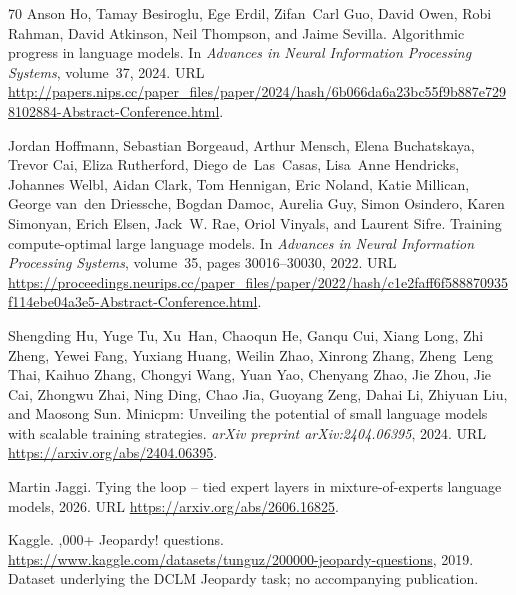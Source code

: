 \documentclass[]{bytedance_seed}
\theoremstyle{definition}
\theoremstyle{remark}
\begin{document}
\begin{thebibliography}{70}
Anson Ho, Tamay Besiroglu, Ege Erdil, Zifan~Carl Guo, David Owen, Robi Rahman,
  David Atkinson, Neil Thompson, and Jaime Sevilla.
\newblock Algorithmic progress in language models.
\newblock In \emph{Advances in Neural Information Processing Systems},
  volume~37, 2024.
\newblock URL
  \url{http://papers.nips.cc/paper_files/paper/2024/hash/6b066da6a23bc55f9b887e7298102884-Abstract-Conference.html}.

Jordan Hoffmann, Sebastian Borgeaud, Arthur Mensch, Elena Buchatskaya, Trevor
  Cai, Eliza Rutherford, Diego de~Las~Casas, Lisa~Anne Hendricks, Johannes
  Welbl, Aidan Clark, Tom Hennigan, Eric Noland, Katie Millican, George van~den
  Driessche, Bogdan Damoc, Aurelia Guy, Simon Osindero, Karen Simonyan, Erich
  Elsen, Jack~W. Rae, Oriol Vinyals, and Laurent Sifre.
\newblock Training compute-optimal large language models.
\newblock In \emph{Advances in Neural Information Processing Systems},
  volume~35, pages 30016--30030, 2022.
\newblock URL
  \url{https://proceedings.neurips.cc/paper_files/paper/2022/hash/c1e2faff6f588870935f114ebe04a3e5-Abstract-Conference.html}.

Shengding Hu, Yuge Tu, Xu~Han, Chaoqun He, Ganqu Cui, Xiang Long, Zhi Zheng,
  Yewei Fang, Yuxiang Huang, Weilin Zhao, Xinrong Zhang, Zheng~Leng Thai,
  Kaihuo Zhang, Chongyi Wang, Yuan Yao, Chenyang Zhao, Jie Zhou, Jie Cai,
  Zhongwu Zhai, Ning Ding, Chao Jia, Guoyang Zeng, Dahai Li, Zhiyuan Liu, and
  Maosong Sun.
\newblock Minicpm: Unveiling the potential of small language models with
  scalable training strategies.
\newblock \emph{arXiv preprint arXiv:2404.06395}, 2024.
\newblock URL \url{https://arxiv.org/abs/2404.06395}.

Martin Jaggi.
\newblock Tying the loop -- tied expert layers in mixture-of-experts language
  models, 2026.
\newblock URL \url{https://arxiv.org/abs/2606.16825}.

{Kaggle}.
,000+ {J}eopardy! questions.
\newblock
  \url{https://www.kaggle.com/datasets/tunguz/200000-jeopardy-questions}, 2019.
\newblock Dataset underlying the DCLM Jeopardy task; no accompanying
  publication.


\end{thebibliography}
\end{document}
